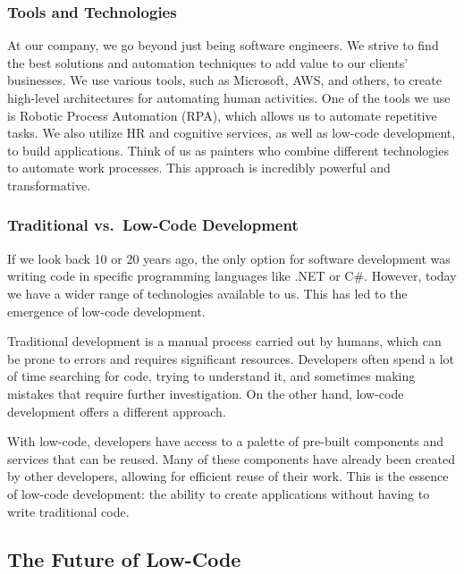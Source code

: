 \subsubsection{Tools and Technologies}\label{tools-and-technologies}

At our company, we go beyond just being software engineers. We strive to
find the best solutions and automation techniques to add value to our
clients' businesses. We use various tools, such as Microsoft, AWS, and
others, to create high-level architectures for automating human
activities. One of the tools we use is Robotic Process Automation (RPA),
which allows us to automate repetitive tasks. We also utilize HR and
cognitive services, as well as low-code development, to build
applications. Think of us as painters who combine different technologies
to automate work processes. This approach is incredibly powerful and
transformative.

\subsubsection{Traditional vs.~Low-Code
  Development}\label{traditional-vs.-low-code-development}

If we look back 10 or 20 years ago, the only option for software
development was writing code in specific programming languages like .NET
or C\#. However, today we have a wider range of technologies
available to us. This has led to the emergence of low-code development.

Traditional development is a manual process carried out by humans, which
can be prone to errors and requires significant resources. Developers
often spend a lot of time searching for code, trying to understand it,
and sometimes making mistakes that require further investigation. On the
other hand, low-code development offers a different approach.

With low-code, developers have access to a palette of pre-built
components and services that can be reused. Many of these components
have already been created by other developers, allowing for efficient
reuse of their work. This is the essence of low-code development: the
ability to create applications without having to write traditional code.

\subsection{The Future of Low-Code}\label{the-future-of-low-code}

